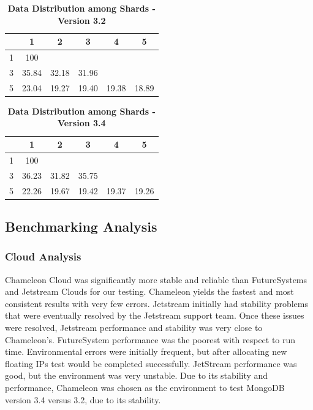 \documentclass[9pt,twocolumn,twoside]{../../styles/osajnl}
\begin{document}
\begin{table}[htbp]
\centering
\caption{\bf Data Distribution among Shards - Version 3.2}

 \begin{tabular}{| c | c | c | c | c | c |} 
 \hline
  &  1    &  2    &  3    &   4   & 5 \\ [0.5ex]
\hline
  \hline
1 & 100   &       &       &       &   \\
\hline
3 & 35.84 & 32.18 & 31.96 &       &   \\
\hline
5 & 23.04 & 19.27 & 19.40 & 19.38 & 18.89   \\
\hline
\end{tabular}
  \label{tab:data-dist32}
\end{table}



\begin{table}[htbp]
\centering
\caption{\bf Data Distribution among Shards - Version 3.4}

 \begin{tabular}{| c | c | c | c | c | c |} 
 \hline
  &  1    &  2    &  3    &   4   & 5 \\ [0.5ex]
\hline
  \hline
1 & 100   &       &       &       &   \\
\hline
3 & 36.23 & 31.82 & 35.75 &       &   \\
\hline
5 & 22.26 & 19.67 & 19.42 & 19.37 & 19.26   \\
\hline
\end{tabular}
  \label{tab:data-dist34}
\end{table}






\subsection{Benchmarking Analysis}


\subsubsection{Cloud Analysis}

Chameleon Cloud was significantly more stable and reliable than
FutureSystems and Jetstream Clouds for our testing. Chameleon yields
the fastest and most consistent results with very few errors.
Jetstream initially had stability problems that were eventually
resolved by the Jetstream support team. Once these issues were
resolved, Jetstream performance and stability was very close to
Chameleon's. FutureSystem performance was the poorest with respect to
run time. Environmental errors were initially frequent, but after
allocating new floating IPs test would be completed successfully.
JetStream performance was good, but the environment was very unstable.
Due to its stability and performance, Chameleon was chosen as the
environment to test MongoDB version 3.4 versus 3.2, due to its
stability.
\end{document}
